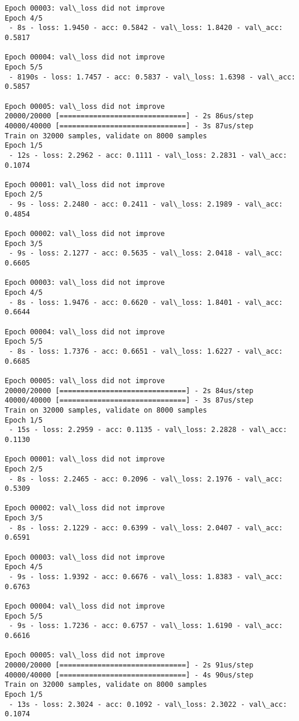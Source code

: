 \documentclass[11pt]{article}
\begin{document}
\begin{Verbatim}[commandchars=\\\{\}]
Epoch 00003: val\_loss did not improve
Epoch 4/5
 - 8s - loss: 1.9450 - acc: 0.5842 - val\_loss: 1.8420 - val\_acc: 0.5817

Epoch 00004: val\_loss did not improve
Epoch 5/5
 - 8190s - loss: 1.7457 - acc: 0.5837 - val\_loss: 1.6398 - val\_acc: 0.5857

Epoch 00005: val\_loss did not improve
20000/20000 [==============================] - 2s 86us/step
40000/40000 [==============================] - 3s 87us/step
Train on 32000 samples, validate on 8000 samples
Epoch 1/5
 - 12s - loss: 2.2962 - acc: 0.1111 - val\_loss: 2.2831 - val\_acc: 0.1074

Epoch 00001: val\_loss did not improve
Epoch 2/5
 - 9s - loss: 2.2480 - acc: 0.2411 - val\_loss: 2.1989 - val\_acc: 0.4854

Epoch 00002: val\_loss did not improve
Epoch 3/5
 - 9s - loss: 2.1277 - acc: 0.5635 - val\_loss: 2.0418 - val\_acc: 0.6605

Epoch 00003: val\_loss did not improve
Epoch 4/5
 - 8s - loss: 1.9476 - acc: 0.6620 - val\_loss: 1.8401 - val\_acc: 0.6644

Epoch 00004: val\_loss did not improve
Epoch 5/5
 - 8s - loss: 1.7376 - acc: 0.6651 - val\_loss: 1.6227 - val\_acc: 0.6685

Epoch 00005: val\_loss did not improve
20000/20000 [==============================] - 2s 84us/step
40000/40000 [==============================] - 3s 87us/step
Train on 32000 samples, validate on 8000 samples
Epoch 1/5
 - 15s - loss: 2.2959 - acc: 0.1135 - val\_loss: 2.2828 - val\_acc: 0.1130

Epoch 00001: val\_loss did not improve
Epoch 2/5
 - 8s - loss: 2.2465 - acc: 0.2096 - val\_loss: 2.1976 - val\_acc: 0.5309

Epoch 00002: val\_loss did not improve
Epoch 3/5
 - 8s - loss: 2.1229 - acc: 0.6399 - val\_loss: 2.0407 - val\_acc: 0.6591

Epoch 00003: val\_loss did not improve
Epoch 4/5
 - 9s - loss: 1.9392 - acc: 0.6676 - val\_loss: 1.8383 - val\_acc: 0.6763

Epoch 00004: val\_loss did not improve
Epoch 5/5
 - 9s - loss: 1.7236 - acc: 0.6757 - val\_loss: 1.6190 - val\_acc: 0.6616

Epoch 00005: val\_loss did not improve
20000/20000 [==============================] - 2s 91us/step
40000/40000 [==============================] - 4s 90us/step
Train on 32000 samples, validate on 8000 samples
Epoch 1/5
 - 13s - loss: 2.3024 - acc: 0.1092 - val\_loss: 2.3022 - val\_acc: 0.1074


\end{Verbatim}
\end{document}
